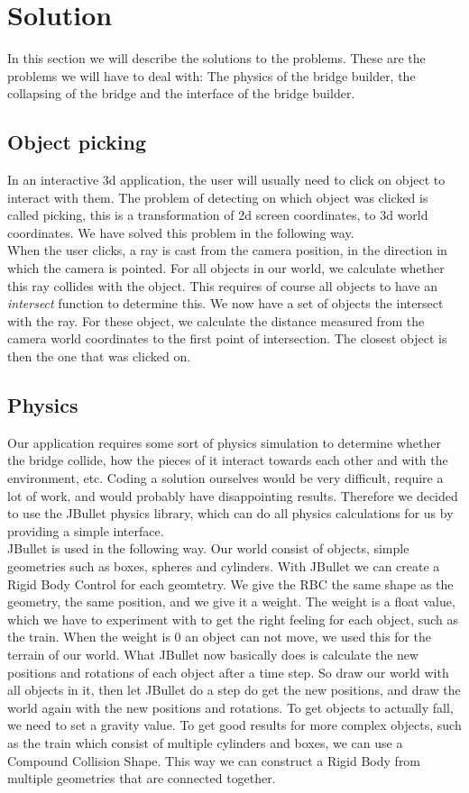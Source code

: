 \section{Solution}
In this section we will describe the solutions to the problems. These are the problems we will have to deal with: The physics of the bridge builder, the collapsing of the bridge and  the interface of the bridge builder.
\subsection{Object picking}
In an interactive 3d application, the user will usually need to click on object to interact with them. The problem of detecting on which object was clicked is called picking, this is a transformation of 2d screen coordinates, to 3d world coordinates. We have solved this problem in the following way.\\
When the user clicks, a ray is cast from the camera position, in the direction in which the camera is pointed. For all objects in our world, we calculate whether this ray collides with the object. This requires of course all objects to have an \emph{intersect} function to determine this. We now have a set of objects the intersect with the ray. For these object, we calculate the distance measured from the camera world coordinates to the first point of intersection. The closest object is then the one that was clicked on.
\subsection{Physics}
Our application requires some sort of physics simulation to determine whether the bridge collide, how the pieces of it interact towards each other and with the environment, etc. Coding a solution ourselves would be very difficult, require a lot of work, and would probably have disappointing results. Therefore we decided to use the JBullet physics library, which can do all physics calculations for us by providing a simple interface. \\
JBullet is used in the following way. Our world consist of objects, simple geometries such as boxes, spheres and cylinders. With JBullet we can create a Rigid Body Control for each geomtetry. We give the RBC the same shape as the geometry, the same position, and we give it a weight. The weight is a float value, which we have to experiment with to get the right feeling for each object, such as the train. When the weight is 0 an object can not move, we used this for the terrain of our world. What JBullet now basically does is calculate the new positions and rotations of each object after a time step. So draw our world with all objects in it, then let JBullet do a step do get the new positions, and draw the world again with the new positions and rotations. To get objects to actually fall, we need to set a gravity value. To get good results for more complex objects, such as the train which consist of multiple cylinders and boxes, we can use a Compound Collision Shape. This way we can construct a Rigid Body from multiple geometries that are connected together. 
